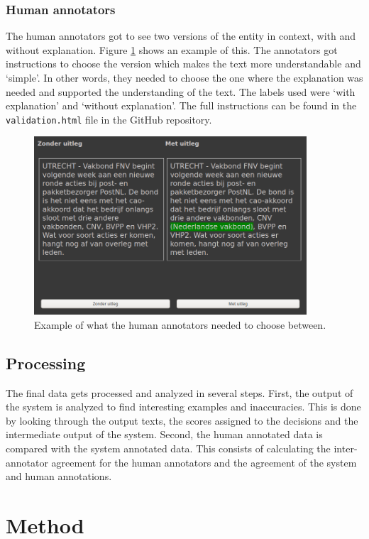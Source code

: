 \documentclass[
10pt, %
a4paper, %
oneside, %
headinclude,footinclude, %
] {book}%
\begin{document}
\subsection{Human annotators}
The human annotators got to see two versions of the entity in context, with and without explanation.
Figure \ref{figure:validation} shows an example of this.
The annotators got instructions to choose the version which makes the text more understandable and `simple'.
In other words, they needed to choose the one where the explanation was needed and supported the understanding of the text.
The labels used were `with explanation' and `without explanation'.
The full instructions can be found in the \verb+validation.html+ file in the GitHub repository.

\begin{figure}[hbtp]\centering
  \includegraphics[width=4in]{validation_example.png}
  \caption{Example of what the human annotators needed to choose between.\label{figure:validation}}
\end{figure}

\section{Processing}
The final data gets processed and analyzed in several steps.
First, the output of the system is analyzed to find interesting examples and inaccuracies.
This is done by looking through the output texts, the scores assigned to the decisions and the intermediate output of the system.
Second, the human annotated data is compared with the system annotated data.
This consists of calculating the inter-annotator agreement for the human annotators and the agreement of the system and human annotations.

\chapter{Method}
\end{document}
